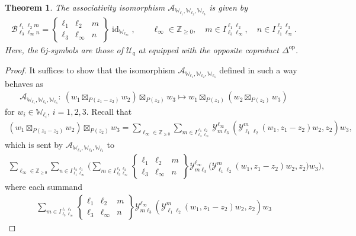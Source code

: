 \documentclass[pdftex]{sigma}
\numberwithin{equation}{section}
\newtheorem{thm}{Theorem}[section]
\newcommand{\id}{\operatorname{id}}
\newcommand{\op}{\mathrm{op}}
\newcommand{\bZ}{\mathbb{Z}}
\newcommand{\cA}{\mathcal{A}}
\newcommand{\cB}{\mathcal{B}}
\newcommand{\cU}{\mathcal{U}}
\newcommand{\bbmi}{\mathbbm{i}}
\newcommand{\UEA}{\cU}
\newcommand{\Uq}{\UEA_{q}}
\newcommand{\QGcoprod}{\Delta}
\newcommand{\sixjsymb}[6]{
\left\{
\begin{array}{ccc}
 #1 & #2 & #5 \\
 #3 & #4 & #6
\end{array}
\right\}
}
\newcommand{\ascmtx}[6]{\cB^{#1 #2 #5}_{#3 #4 #6}}
\newcommand{\Chan}[4]{I^{#1 #2}_{#3 #4}}
\newcommand{\voaint}{\mathcal{Y}}
\newcommand{\vmodvec}{w}
\newcommand{\virmod}{\mathbb{W}}
\begin{document}
\begin{thm}
\label{thm:assoc_6j}
The associativity isomorphism $\cA_{\virmod_{\ell_{1}},\virmod_{\ell_{2}},\virmod_{\ell_{3}}}$ is given by
\begin{gather*}
 \ascmtx{\ell_{1}}{\ell_{2}}{\ell_{3}}{\ell_{\infty}}{m}{n}=\sixjsymb{\ell_{1}}{\ell_{2}}{\ell_{3}}{\ell_{\infty}}{m}{n}\id_{\virmod_{\ell_{\infty}}},\qquad \ell_{\infty}\in\bZ_{\geq 0}, \quad m\in \Chan{\ell_{1}}{\ell_{2}}{\ell_{3}}{\ell_{\infty}}, \quad n\in \Chan{\ell_{2}}{\ell_{3}}{\ell_{1}}{\ell_{\infty}}.
\end{gather*}
Here, the $6$j-symbols are those of $\Uq$ at \smash{$q={\rm e}^{\pi\bbmi t}$} equipped with the opposite coproduct $\QGcoprod^{\op}$.
\end{thm}
\begin{proof}
It suffices to show that the isomorphism $\cA_{\virmod_{\ell_{1}},\virmod_{\ell_{2}},\virmod_{\ell_{3}}}$ defined in such a way behaves as
\begin{gather*}
 \cA_{\virmod_{\ell_{1}},\virmod_{\ell_{2}},\virmod_{\ell_{3}}}\colon\ (\vmodvec_{1}\boxtimes_{P(z_{1}-z_{2})}\vmodvec_{2})\boxtimes_{P(z_{2})}\vmodvec_{3}\mapsto \vmodvec_{1}\boxtimes_{P(z_{1})}(\vmodvec_{2}\boxtimes_{P(z_{2})}\vmodvec_{3})
\end{gather*}
for $\vmodvec_{i}\in\virmod_{\ell_{i}}$, $i=1,2,3$.
Recall that
\begin{gather*}
 (\vmodvec_{1}\boxtimes_{P(z_{1}-z_{2})}\vmodvec_{2})\boxtimes_{P(z_{2})}\vmodvec_{3}=\sum_{\ell_{\infty}\in\bZ_{\geq 0}}\sum_{m\in \Chan{\ell_{1}}{\ell_{2}}{\ell_{3}}{\ell_{\infty}}}\voaint_{m \ell_{3}}^{\ell_{\infty}}(\voaint_{\ell_{1} \ell_{2}}^{m}(\vmodvec_{1},z_{1}-z_{2})\vmodvec_{2},z_{2})\vmodvec_{3},
\end{gather*}
which is sent by $\cA_{\virmod_{\ell_{1}},\virmod_{\ell_{2}},\virmod_{\ell_{3}}}$ to
\begin{align}
\label{eq:associativity_computation_intermediate}
 \sum_{\ell_{\infty}\in\bZ_{\geq 0}}\sum_{n\in \Chan{\ell_{2}}{\ell_{3}}{\ell_{1}}{\ell_{\infty}}}\bigg(\sum_{m\in \Chan{\ell_{1}}{\ell_{2}}{\ell_{3}}{\ell_{\infty}}}\sixjsymb{\ell_{1}}{\ell_{2}}{\ell_{3}}{\ell_{\infty}}{m}{n}\voaint_{m \ell_{3}}^{\ell_{\infty}}\bigg(\voaint_{\ell_{1} \ell_{2}}^{m}(\vmodvec_{1},z_{1}-z_{2})\vmodvec_{2},z_{2}\bigg)\vmodvec_{3}\bigg),
\end{align}
where each summand
\begin{gather*}
 \sum_{m\in \Chan{\ell_{1}}{\ell_{2}}{\ell_{3}}{\ell_{\infty}}}\sixjsymb{\ell_{1}}{\ell_{2}}{\ell_{3}}{\ell_{\infty}}{m}{n}\voaint_{m \ell_{3}}^{\ell_{\infty}}(\voaint_{\ell_{1} \ell_{2}}^{m}(\vmodvec_{1},z_{1}-z_{2})\vmodvec_{2},z_{2})\vmodvec_{3}

\end{gather*}
\end{proof}
\end{document}
